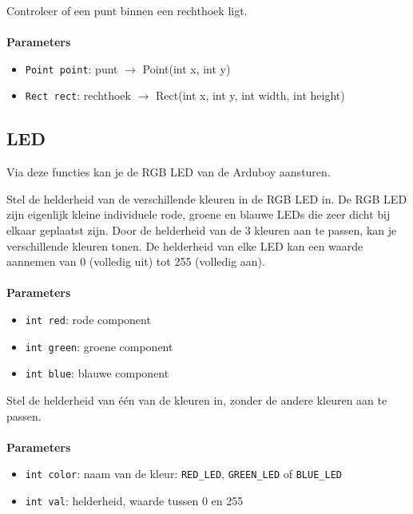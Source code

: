 \documentclass[11pt,fleqn]{book} %
\begin{document}
\begin{libf}
	Controleer of een punt binnen een rechthoek ligt.\\ \\
	\textbf{Parameters}
	\begin{itemize}
		\item \texttt{Point point}: punt $\rightarrow$ Point(int x, int y)
		\item \texttt{Rect rect}: rechthoek $\rightarrow$ Rect(int x, int y, int width, int height)
	\end{itemize}
\end{libf}

\subsection{LED}
Via deze functies kan je de RGB LED van de Arduboy aansturen.

\begin{libf}
	Stel de helderheid van de verschillende kleuren in de RGB LED in. De RGB LED zijn eigenlijk kleine individuele rode, groene en blauwe LEDs die zeer dicht bij elkaar geplaatst zijn. Door de helderheid van de 3 kleuren aan te passen, kan je verschillende kleuren tonen.
	De helderheid van elke LED kan een waarde aannemen van 0 (volledig uit) tot 255 (volledig aan).\\ \\
	\textbf{Parameters}
	\begin{itemize}
		\item \texttt{int red}: rode component
		\item \texttt{int green}: groene component
		\item \texttt{int blue}: blauwe component
	\end{itemize}
\end{libf}

\begin{libf}
	Stel de helderheid van één van de kleuren in, zonder de andere kleuren aan te passen.\\ \\
	\textbf{Parameters}
	\begin{itemize}
		\item \texttt{int color}: naam van de kleur: \texttt{RED\_LED}, \texttt{GREEN\_LED} of \texttt{BLUE\_LED}
		\item \texttt{int val}: helderheid, waarde tussen 0 en 255
	\end{itemize}
\end{libf}
\end{document}
